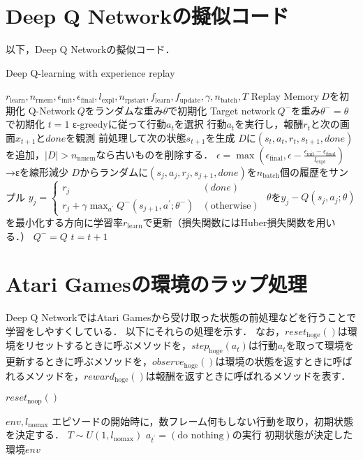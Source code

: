 \documentclass{jarticle}
\begin{document}
\section{Deep Q Networkの擬似コード}
以下，Deep Q Networkの擬似コード．
\begin{algorithm}[htb]
\caption{Deep Q-learning with experience replay}
\label{alg:dqn}                          
\begin{algorithmic}[1]   
\REQUIRE $r_{\mathrm{learn}},n_{\mathrm{rmem}},\epsilon_{\mathrm{init}},\epsilon_{\mathrm{final}},l_{\mathrm{expl}},n_{\mathrm{rpstart}},f_{\mathrm{learn}},f_{\mathrm{update}},\gamma,n_{\mathrm{batch}}, T$
\STATE Replay Memory$~D$を初期化
\STATE Q-Network$~Q$をランダムな重み$\theta$で初期化
\STATE Target network$~Q^-$を重み$\theta^-=\theta$で初期化
\STATE $t=1$
\STATE ε-greedyに従って行動$a_t$を選択
\STATE 行動$a_t$を実行し，報酬$r_t$と次の画面$x_{t+1}$と$done$を観測
\STATE 前処理して次の状態$s_{t+1}$を生成
\STATE $D$に$(s_t,a_t,r_t,s_{t+1},done)$を追加，$|D|>n_{\mathrm{nmem}}$なら古いものを削除する．
\STATE $\epsilon=\max{(\epsilon_{\mathrm{final}},\epsilon-\frac{\epsilon_{\mathrm{init}}-\epsilon_{\mathrm{final}}}{l_{\mathrm{expl}}})}$→εを線形減少
\STATE $D$からランダムに$(s_j,a_j,r_j,s_{j+1},done)$を$n_{\mathrm{batch}}$個の履歴をサンプル
\STATE $y_j=
\begin{cases}
r_j & (done) \\
r_j+\gamma\max_{a^{\prime}}Q^-(s_{j+1},a^{\prime};\theta^-) & (\mbox{otherwise})
\end{cases}$
\STATE $\theta$を$y_j-Q(s_j,a_j;\theta)$を最小化する方向に学習率$r_{\mathrm{learn}}$で更新（損失関数にはHuber損失関数を用いる．）
\ENDIF
{}
\STATE $Q^-=Q$
\ENDIF
\ENDIF
\STATE $t=t+1$
\ENDWHILE
\ENDWHILE
\end{algorithmic}
\end{algorithm}


\section{Atari Gamesの環境のラップ処理}
Deep Q NetworkではAtari Gamesから受け取った状態の前処理などを行うことで学習をしやすくしている．
以下にそれらの処理を示す．
なお，$reset_{\mathrm{hoge}}()$は環境をリセットするときに呼ぶメソッドを，$step_{\mathrm{hoge}}(a_t)$は行動$a_t$を取って環境を更新するときに呼ぶメソッドを，$observe_{\mathrm{hoge}}()$は環境の状態を返すときに呼ばれるメソッドを，$reward_{\mathrm{hoge}}()$は報酬を返すときに呼ばれるメソッドを表す．
\begin{algorithm}[htb]
\caption{$reset_{\mathrm{noop}}()$}
\label{alg:noop_reset}                          
\begin{algorithmic}[1]   
\REQUIRE $env, l_{\mathrm{nomax}}$
\STATE エピソードの開始時に，数フレーム何もしない行動を取り，初期状態を決定する．
\STATE $T\sim U(1,l_{\mathrm{nomax}})$
\STATE $a_{t^{\prime}}=(\mbox{do nothing})$の実行
\ENDFOR
\ENSURE 初期状態が決定した環境$env$
\end{algorithmic}
\end{algorithm}
\end{document}

